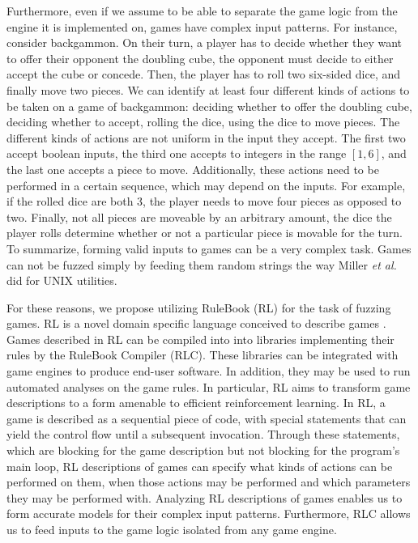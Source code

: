 Furthermore, even if we assume to be able to separate the game logic from the engine it is implemented on, games have complex input patterns.
For instance, consider backgammon.
On their turn, a player has to decide whether they want to offer their opponent the doubling cube, the opponent must decide to either accept the cube or concede.
Then, the player has to roll two six-sided dice, and finally move two pieces.
We can identify at least four different kinds of actions to be taken on a game of backgammon: deciding whether to offer the doubling cube, deciding whether to accept, rolling the dice, using the dice to move pieces.
The different kinds of actions are not uniform in the input they accept.
The first two accept boolean inputs, the third one accepts to integers in the range $[1,6]$, and the last one accepts a piece to move.
Additionally, these actions need to be performed in a certain sequence, which may depend on the inputs.
For example, if the rolled dice are both 3, the player needs to move four pieces as opposed to two.
Finally, not all pieces are moveable by an arbitrary amount, the dice the player rolls determine whether or not a particular piece is movable for the turn.
To summarize, forming valid inputs to games can be a very complex task.
Games can not be fuzzed simply by feeding them random strings the way Miller \textit{et al.} did for UNIX utilities.

For these reasons, we propose utilizing RuleBook (RL) for the task of fuzzing games.
RL is a novel domain specific language conceived to describe games \cite{RLC}.
Games described in RL can be compiled into into libraries implementing their rules by the RuleBook Compiler (RLC).
These libraries can be integrated with game engines to produce end-user software.
In addition, they may be used to run automated analyses on the game rules.
In particular, RL aims to transform game descriptions to a form amenable to efficient reinforcement learning.
In RL, a game is described as a sequential piece of code, with special statements that can yield the control flow until a subsequent invocation.
Through these statements, which are blocking for the game description but not blocking for the program's main loop, RL descriptions of games can specify what kinds of actions can be performed on them, when those actions may be performed and which parameters they may be performed with.
Analyzing RL descriptions of games enables us to form accurate models for their complex input patterns.
Furthermore, RLC allows us to feed inputs to the game logic isolated from any game engine.

